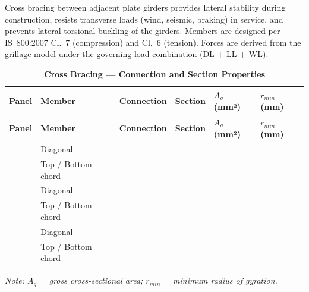 \documentclass[12pt,a4paper]{report}
\numberwithin{table}{chapter}
\numberwithin{figure}{chapter}
\begin{document}
Cross bracing between adjacent plate girders provides lateral stability during construction, resists transverse loads (wind, seismic, braking) in service, and prevents lateral torsional buckling of the girders. Members are designed per IS~800:2007 Cl.~7 (compression) and Cl.~6 (tension). Forces are derived from the grillage model under the governing load combination  (DL + LL + WL).

\vspace{1em}

\vspace{0.4em}
\noindent
\setlength{\tabcolsep}{4pt}
\setlength\LTleft{0pt}
\setlength\LTright{\fill}

\begin{longtable}{|C{2.0cm}|L{2.0cm}|L{2.2cm}|C{2.5cm}|C{2.0cm}|C{2.0cm}|}
\caption{\textbf{Cross Bracing --- Connection and Section Properties}}
\hline
{} \textbf{Panel} & \textbf{Member} & \textbf{Connection} & \textbf{Section} & \textbf{$A_g$ (mm²)} & \textbf{$r_{min}$ (mm)} \\[6pt]
\hline
\endfirsthead
\hline
{} \textbf{Panel} & \textbf{Member} & \textbf{Connection} & \textbf{Section} & \textbf{$A_g$ (mm²)} & \textbf{$r_{min}$ (mm)} \\[6pt]
\hline
\endhead
{} & Diagonal &  &  &  &  \\[6pt]
 & Top / Bottom chord &  &  &  &  \\[6pt]
\hline
{} & Diagonal &  &  &  &  \\[6pt]
 & Top / Bottom chord &  &  &  &  \\[6pt]
\hline
{} & Diagonal &  &  &  &  \\[6pt]
 & Top / Bottom chord &  &  &  &  \\[6pt]
\hline
\end{longtable}
\noindent\textit{Note: $A_g$ = gross cross-sectional area; $r_{min}$ = minimum radius of gyration.}
\end{document}
